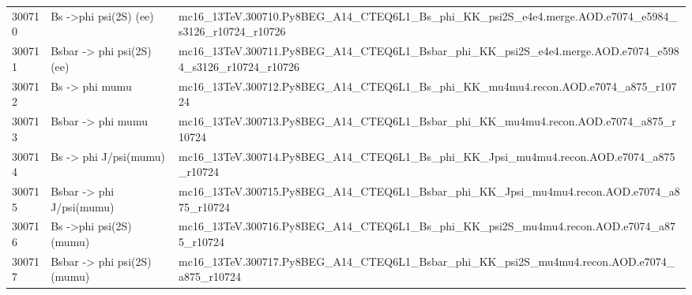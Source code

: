 \begin{table}[ht]
{\begin{tabular}{l l l}
300710 & Bs ->phi psi(2S) (ee) & mc16\_13TeV.300710.Py8BEG\_A14\_CTEQ6L1\_Bs\_phi\_KK\_psi2S\_e4e4.merge.AOD.e7074\_e5984\_s3126\_r10724\_r10726 \\
300711 & Bsbar -> phi psi(2S) (ee) & mc16\_13TeV.300711.Py8BEG\_A14\_CTEQ6L1\_Bsbar\_phi\_KK\_psi2S\_e4e4.merge.AOD.e7074\_e5984\_s3126\_r10724\_r10726 \\
300712 & Bs -> phi mumu & mc16\_13TeV.300712.Py8BEG\_A14\_CTEQ6L1\_Bs\_phi\_KK\_mu4mu4.recon.AOD.e7074\_a875\_r10724 \\
300713 & Bsbar -> phi mumu & mc16\_13TeV.300713.Py8BEG\_A14\_CTEQ6L1\_Bsbar\_phi\_KK\_mu4mu4.recon.AOD.e7074\_a875\_r10724 \\
300714 & Bs -> phi J/psi(mumu) & mc16\_13TeV.300714.Py8BEG\_A14\_CTEQ6L1\_Bs\_phi\_KK\_Jpsi\_mu4mu4.recon.AOD.e7074\_a875\_r10724 \\
300715 & Bsbar -> phi J/psi(mumu) & mc16\_13TeV.300715.Py8BEG\_A14\_CTEQ6L1\_Bsbar\_phi\_KK\_Jpsi\_mu4mu4.recon.AOD.e7074\_a875\_r10724 \\
300716 & Bs ->phi psi(2S) (mumu) & mc16\_13TeV.300716.Py8BEG\_A14\_CTEQ6L1\_Bs\_phi\_KK\_psi2S\_mu4mu4.recon.AOD.e7074\_a875\_r10724 \\
300717 & Bsbar -> phi psi(2S) (mumu) & mc16\_13TeV.300717.Py8BEG\_A14\_CTEQ6L1\_Bsbar\_phi\_KK\_psi2S\_mu4mu4.recon.AOD.e7074\_a875\_r10724 \\
\hline
\end{tabular} 
}
\label{app:tab:data:sig}
\end{table}


